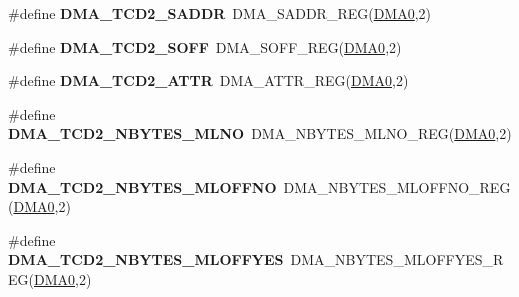 \begin{DoxyCompactItemize}
\item 
\#define {\bfseries D\+M\+A\+\_\+\+T\+C\+D2\+\_\+\+S\+A\+D\+DR}~D\+M\+A\+\_\+\+S\+A\+D\+D\+R\+\_\+\+R\+EG(\hyperlink{group__DMA__Peripheral__Access__Layer_ga4103044f9ca209772f513dc694513ffb}{D\+M\+A0},2)\hypertarget{group__DMA__Register__Accessor__Macros_gad1ffbc1cb0292663f36900d4e1c25580}{}\label{group__DMA__Register__Accessor__Macros_gad1ffbc1cb0292663f36900d4e1c25580}

\item 
\#define {\bfseries D\+M\+A\+\_\+\+T\+C\+D2\+\_\+\+S\+O\+FF}~D\+M\+A\+\_\+\+S\+O\+F\+F\+\_\+\+R\+EG(\hyperlink{group__DMA__Peripheral__Access__Layer_ga4103044f9ca209772f513dc694513ffb}{D\+M\+A0},2)\hypertarget{group__DMA__Register__Accessor__Macros_ga778e50197a65e123a80815d1870b42b0}{}\label{group__DMA__Register__Accessor__Macros_ga778e50197a65e123a80815d1870b42b0}

\item 
\#define {\bfseries D\+M\+A\+\_\+\+T\+C\+D2\+\_\+\+A\+T\+TR}~D\+M\+A\+\_\+\+A\+T\+T\+R\+\_\+\+R\+EG(\hyperlink{group__DMA__Peripheral__Access__Layer_ga4103044f9ca209772f513dc694513ffb}{D\+M\+A0},2)\hypertarget{group__DMA__Register__Accessor__Macros_ga18a70afba86453e8b5e9c89f22a11412}{}\label{group__DMA__Register__Accessor__Macros_ga18a70afba86453e8b5e9c89f22a11412}

\item 
\#define {\bfseries D\+M\+A\+\_\+\+T\+C\+D2\+\_\+\+N\+B\+Y\+T\+E\+S\+\_\+\+M\+L\+NO}~D\+M\+A\+\_\+\+N\+B\+Y\+T\+E\+S\+\_\+\+M\+L\+N\+O\+\_\+\+R\+EG(\hyperlink{group__DMA__Peripheral__Access__Layer_ga4103044f9ca209772f513dc694513ffb}{D\+M\+A0},2)\hypertarget{group__DMA__Register__Accessor__Macros_gaa7eefc1531e30e8f88f39e91f8468244}{}\label{group__DMA__Register__Accessor__Macros_gaa7eefc1531e30e8f88f39e91f8468244}

\item 
\#define {\bfseries D\+M\+A\+\_\+\+T\+C\+D2\+\_\+\+N\+B\+Y\+T\+E\+S\+\_\+\+M\+L\+O\+F\+F\+NO}~D\+M\+A\+\_\+\+N\+B\+Y\+T\+E\+S\+\_\+\+M\+L\+O\+F\+F\+N\+O\+\_\+\+R\+EG(\hyperlink{group__DMA__Peripheral__Access__Layer_ga4103044f9ca209772f513dc694513ffb}{D\+M\+A0},2)\hypertarget{group__DMA__Register__Accessor__Macros_ga9a66b7923ef33c03d078edaf888dbe50}{}\label{group__DMA__Register__Accessor__Macros_ga9a66b7923ef33c03d078edaf888dbe50}

\item 
\#define {\bfseries D\+M\+A\+\_\+\+T\+C\+D2\+\_\+\+N\+B\+Y\+T\+E\+S\+\_\+\+M\+L\+O\+F\+F\+Y\+ES}~D\+M\+A\+\_\+\+N\+B\+Y\+T\+E\+S\+\_\+\+M\+L\+O\+F\+F\+Y\+E\+S\+\_\+\+R\+EG(\hyperlink{group__DMA__Peripheral__Access__Layer_ga4103044f9ca209772f513dc694513ffb}{D\+M\+A0},2)\hypertarget{group__DMA__Register__Accessor__Macros_gae2118daf31ada0b80777846e3a4392d4}{}\label{group__DMA__Register__Accessor__Macros_gae2118daf31ada0b80777846e3a4392d4}


\end{DoxyCompactItemize}
